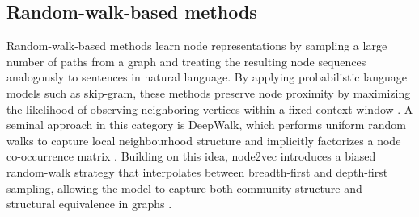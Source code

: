 \subsection{ Random-walk-based methods}
Random-walk-based methods learn node representations by sampling a large number of paths from a graph and treating the resulting node sequences analogously to sentences in natural language. By applying probabilistic language models such as skip-gram, these methods preserve node proximity by maximizing the likelihood of observing neighboring vertices within a fixed context window \citep{Chen_2020}. A seminal approach in this category is DeepWalk, which performs uniform random walks to capture local neighbourhood structure and implicitly factorizes a node co-occurrence matrix \citep{perozzi2014deepwalk}. Building on this idea, node2vec introduces a biased random-walk strategy that interpolates between breadth-first and depth-first sampling, allowing the model to capture both community structure and structural equivalence in graphs \citep{grover2016node2vec}.


